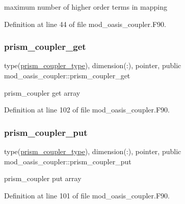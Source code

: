 maximum number of higher order terms in mapping 



Definition at line 44 of file mod\+\_\+oasis\+\_\+coupler.\+F90.

\mbox{\label{namespacemod__oasis__coupler_a96df3ef2ec1b53597bb9beca43fe8349}} 
\subsubsection{\texorpdfstring{prism\+\_\+coupler\+\_\+get}{prism\_coupler\_get}}
{\footnotesize\ttfamily type(\hyperlink{structmod__oasis__coupler_1_1prism__coupler__type}{prism\+\_\+coupler\+\_\+type}), dimension(\+:), pointer, public mod\+\_\+oasis\+\_\+coupler\+::prism\+\_\+coupler\+\_\+get}



prism\+\_\+coupler get array 



Definition at line 102 of file mod\+\_\+oasis\+\_\+coupler.\+F90.

\mbox{\label{namespacemod__oasis__coupler_ae59d8823993d9ca8610efd9770393271}} 
\subsubsection{\texorpdfstring{prism\+\_\+coupler\+\_\+put}{prism\_coupler\_put}}
{\footnotesize\ttfamily type(\hyperlink{structmod__oasis__coupler_1_1prism__coupler__type}{prism\+\_\+coupler\+\_\+type}), dimension(\+:), pointer, public mod\+\_\+oasis\+\_\+coupler\+::prism\+\_\+coupler\+\_\+put}



prism\+\_\+coupler put array 



Definition at line 101 of file mod\+\_\+oasis\+\_\+coupler.\+F90.

\mbox{\label{namespacemod__oasis__coupler_aaa019c39b0f657e7c37820697ecf354a}} 
